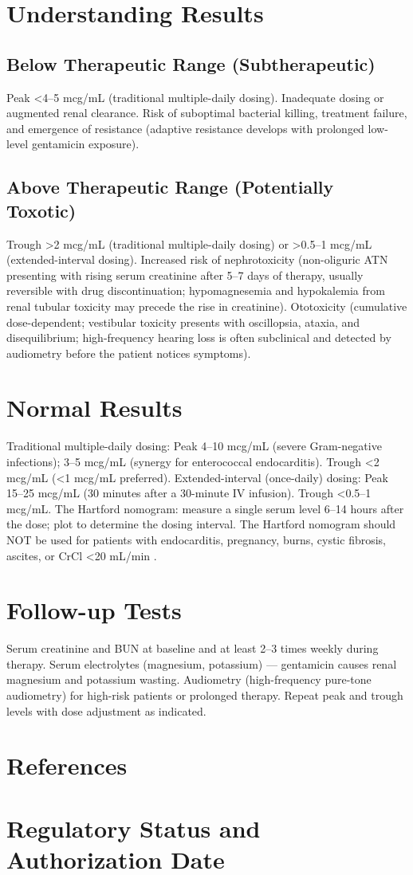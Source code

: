 \section*{Understanding Results}

\subsection*{Below Therapeutic Range (Subtherapeutic)}
Peak <4--5 mcg/mL (traditional multiple-daily dosing). Inadequate dosing or augmented renal clearance. Risk of suboptimal bacterial killing, treatment failure, and emergence of resistance (adaptive resistance develops with prolonged low-level gentamicin exposure).

\subsection*{Above Therapeutic Range (Potentially Toxotic)}
Trough >2 mcg/mL (traditional multiple-daily dosing) or >0.5--1 mcg/mL (extended-interval dosing). Increased risk of nephrotoxicity (non-oliguric ATN presenting with rising serum creatinine after 5--7 days of therapy, usually reversible with drug discontinuation; hypomagnesemia and hypokalemia from renal tubular toxicity may precede the rise in creatinine). Ototoxicity (cumulative dose-dependent; vestibular toxicity presents with oscillopsia, ataxia, and disequilibrium; high-frequency hearing loss is often subclinical and detected by audiometry before the patient notices symptoms).

\section*{Normal Results}
Traditional multiple-daily dosing: Peak 4--10 mcg/mL (severe Gram-negative infections); 3--5 mcg/mL (synergy for enterococcal endocarditis). Trough <2 mcg/mL (<1 mcg/mL preferred). Extended-interval (once-daily) dosing: Peak 15--25 mcg/mL (30 minutes after a 30-minute IV infusion). Trough <0.5--1 mcg/mL. The Hartford nomogram: measure a single serum level 6--14 hours after the dose; plot to determine the dosing interval. The Hartford nomogram should NOT be used for patients with endocarditis, pregnancy, burns, cystic fibrosis, ascites, or CrCl <20 mL/min \cite{winter2010basic}.

\section*{Follow-up Tests}
Serum creatinine and BUN at baseline and at least 2--3 times weekly during therapy. Serum electrolytes (magnesium, potassium) --- gentamicin causes renal magnesium and potassium wasting. Audiometry (high-frequency pure-tone audiometry) for high-risk patients or prolonged therapy. Repeat peak and trough levels with dose adjustment as indicated.

\section*{References}



\clearpage
\section*{Regulatory Status and Authorization Date}

\clearpage
